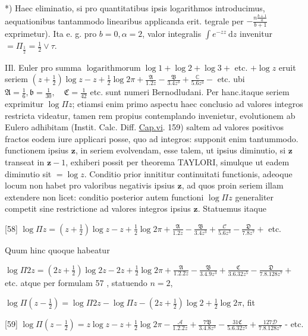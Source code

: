 \documentclass[10pt]{article}
\begin{document}
*) Haec eliminatio, si pro quantitatibus ipsis logarithmos introducimus, aequationibus tantammodo linearibus applicanda erit.
tegrale per \(-\frac{n \frac{b+1}{a}}{b+1}\) exprimetur). Ita e. g. pro \(b=0, \alpha=2\), valor integralis \(\int e^{-z z} \mathrm{~d} z\) invenitur \(=\Pi_{\frac{1}{2}}=\frac{1}{2} \vee \tau\).

IIl. Euler pro summa \(\operatorname{logarithmorum} \log 1+\log 2+\log 3+\) etc. \(+\log z\) eruit seriem \(\left(z+\frac{1}{2}\right) \log z-z+\frac{1}{2} \log 2 \pi+\frac{\mathfrak{A}}{1.2 z}-\frac{\mathfrak{B}}{3.4 z^{3}}+\frac{\mathbb{C}}{5.6 z^{3}}-\) etc. ubi \(\mathfrak{A}=\frac{1}{6}, \mathfrak{b}=\frac{1}{30}, \quad \mathfrak{C}=\frac{1}{42}\) etc. sunt numeri Bernodludani. Per hanc.itaque seriem exprimitur \(\log \Pi z\); etiamsi enim primo aspectu haec conclusio ad valores integros restricta videatur, tamen rem propius contemplando invenietur, evolutionem ab Eulero adhibitam (Instit. Calc. Diff. \href{http://Cap.vi}{Cap.vi}. 159) saltem ad valores positivos fractos eodem iure applicari posse, quo ad integros: supponit enim tantummodo. functionem ipsius \(\boldsymbol{z}\), in seriem evolvendam, esse talem, ut ipsius diminutio, si \(\boldsymbol{z}\) transeat in \(\boldsymbol{z}-1\), exhiberi possit per theorema TAYLORI, simulque ut eadem diminutio sit \(=\log z\). Conditio prior innititur continuitati functionis, adeoque locum non habet pro valoribus negativis ipsius \(\boldsymbol{z}\), ad quos proin seriem illam extendere non licet: conditio posterior autem functioni \(\log \Pi z\) generaliter competit sine restrictione ad valores integros ipsius \(\boldsymbol{z}\). Statuemus itaque

[58] \(\log \Pi z=\left(z+\frac{1}{2}\right) \log z-z+\frac{1}{2} \log 2 \pi+\frac{\mathfrak{A}}{1.2 z}-\frac{\mathfrak{B}}{3.4 z^{3}}+\frac{\mathscr{C}}{5.6 z^{3}}-\frac{\mathfrak{D}}{7.8 z^{7}}+\) etc.

Quum hinc quoque habeatur

\(\log \Pi 2 z=\left(2 z+\frac{1}{2}\right) \log 2 z-2 z+\frac{1}{2} \log 2 \pi+\frac{\mathfrak{A}}{1.2 .2 z}-\frac{\mathfrak{B}}{3.4 .9 z^{3}}+\frac{\mathfrak{C}}{3.6 .32 z^{5}}-\frac{\mathfrak{D}}{7.8 .128 z^{7}}+\) etc. atque per formulam 57 , statuendo \(n=2\),

\(\log \Pi\left(z-\frac{1}{2}\right)=\log \Pi 2 z-\log \Pi z-\left(2 z+\frac{1}{2}\right) \log 2+\frac{1}{2} \log 2 \pi\), fit

[59] \(\log \Pi\left(z-\frac{1}{2}\right)=z \log z-z+\frac{1}{2} \log 2 \pi-\frac{\mathscr{A}}{1.2 .2 z}+\frac{7 \mathfrak{B}}{3.4 .8 z^{3}}-\frac{31 \mathfrak{C}}{5.6 .32 z^{5}}+\frac{127 \mathscr{D}}{7.8 .128 z^{7}}\) - etc.
\end{document}
